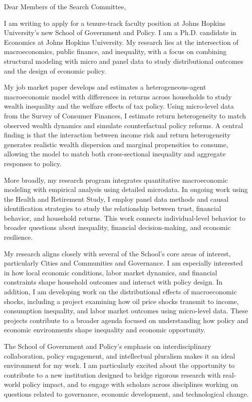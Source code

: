 \documentclass[11pt]{letter}
\begin{document}
\begin{letter}{}

\opening{Dear Members of the Search Committee,}

I am writing to apply for a tenure-track faculty position at Johns Hopkins University’s new School of Government and Policy. I am a Ph.D. candidate in Economics at Johns Hopkins University. My research lies at the intersection of macroeconomics, public finance, and inequality, with a focus on combining structural modeling with micro and panel data to study distributional outcomes and the design of economic policy.

My job market paper develops and estimates a heterogeneous-agent macroeconomic model with differences in returns across households to study wealth inequality and the welfare effects of tax policy. Using micro-level data from the Survey of Consumer Finances, I estimate return heterogeneity to match observed wealth dynamics and simulate counterfactual policy reforms. A central finding is that the interaction between income risk and return heterogeneity generates realistic wealth dispersion and marginal propensities to consume, allowing the model to match both cross-sectional inequality and aggregate responses to policy. 

More broadly, my research program integrates quantitative macroeconomic modeling with empirical analysis using detailed microdata. In ongoing work using the Health and Retirement Study, I employ panel data methods and causal identification strategies to study the relationship between trust, financial behavior, and household returns. This work connects individual-level behavior to broader questions about inequality, financial decision-making, and economic resilience.

My research aligns closely with several of the School’s core areas of interest, particularly Cities and Communities and Governance. I am especially interested in how local economic conditions, labor market dynamics, and financial constraints shape household outcomes and interact with policy design. In addition, I am developing work on the distributional effects of macroeconomic shocks, including a project examining how oil price shocks transmit to income, consumption inequality, and labor market outcomes using micro-level data. These projects contribute to a broader agenda focused on understanding how policy and economic environments shape inequality and economic opportunity.

The School of Government and Policy’s emphasis on interdisciplinary collaboration, policy engagement, and intellectual pluralism makes it an ideal environment for my work. I am particularly excited about the opportunity to contribute to a new institution designed to bridge rigorous research with real-world policy impact, and to engage with scholars across disciplines working on questions related to governance, economic development, and technological change.


\end{letter}
\end{document}
